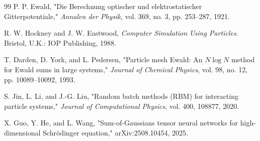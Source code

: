 \documentclass[conference]{IEEEtran}
\begin{document}
\balance
\begin{thebibliography}{99}
P. P. Ewald,
"Die Berechnung optischer und elektrostatischer Gitterpotentiale,"
\emph{Annalen der Physik}, vol. 369, no. 3, pp. 253--287, 1921.

R. W. Hockney and J. W. Eastwood,
\emph{Computer Simulation Using Particles}.
Bristol, U.K.: IOP Publishing, 1988.

T. Darden, D. York, and L. Pedersen,
"Particle mesh Ewald: An $N\log N$ method for Ewald sums in large systems,"
\emph{Journal of Chemical Physics}, vol. 98, no. 12, pp. 10089--10092, 1993.

S. Jin, L. Li, and J.-G. Liu,
"Random batch methods (RBM) for interacting particle systems,"
\emph{Journal of Computational Physics}, vol. 400, 108877, 2020.

X. Guo, Y. He, and L. Wang,
"Sum-of-Gaussians tensor neural networks for high-dimensional Schr\"odinger equation,"
arXiv:2508.10454, 2025.
\end{thebibliography}
\end{document}
